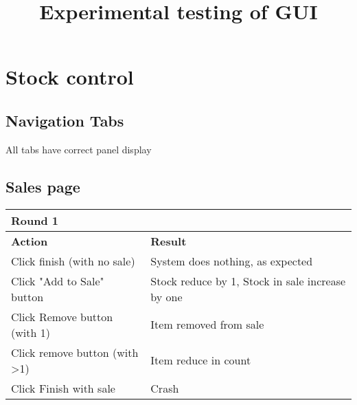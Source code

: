 \documentclass[11pt,a4paper]{article}
\begin{document}
	\title{Experimental testing of GUI}
	\section{Stock control}
	\subsection{Navigation Tabs}
	All tabs have correct panel display
	
	\subsection{Sales page}
	\begin{tabular}{|m{7cm}|m{7cm}|}
		\hline Round 1&\\
		\hline \textbf{Action} & \textbf{Result}\\
		\hline Click finish (with no sale) & System does nothing, as expected\\
		\hline  Click "Add to Sale" button& Stock reduce by 1, Stock in sale increase by one\\
		\hline Click Remove button (with 1)& Item removed from sale\\
		\hline  Click remove button (with >1) & Item reduce in count\\
		\hline Click Finish with sale& \color{red}Crash \\
			\hline 
		\end{tabular}
\end{document}
